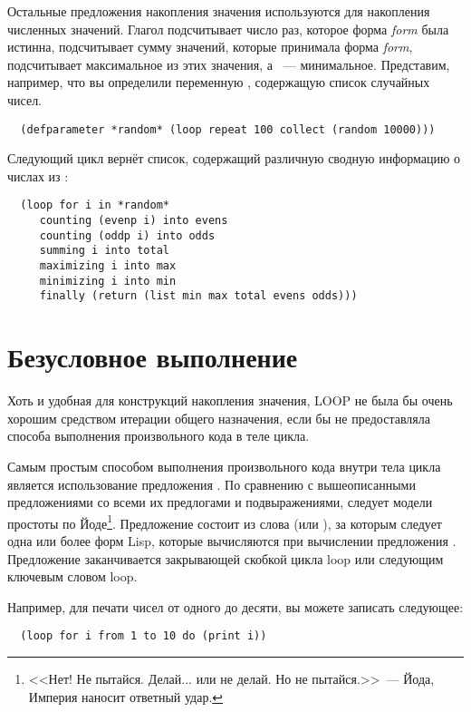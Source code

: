 Остальные предложения накопления значения используются для накопления численных
значений. Глагол  подсчитывает число раз, которое форма \textit{form} была
истинна,  подсчитывает сумму значений, которые принимала форма \textit{form},
 подсчитывает максимальное из этих значения, а ~---
минимальное. Представим, например, что вы определили переменную ,
содержащую список случайных чисел.

\begin{lstlisting}
  (defparameter *random* (loop repeat 100 collect (random 10000)))
\end{lstlisting}

Следующий цикл вернёт список, содержащий различную сводную информацию о числах из
:

\begin{lstlisting}
  (loop for i in *random*
     counting (evenp i) into evens
     counting (oddp i) into odds
     summing i into total
     maximizing i into max
     minimizing i into min
     finally (return (list min max total evens odds)))
\end{lstlisting}

\section{Безусловное выполнение}

Хоть и удобная для конструкций накопления значения, LOOP не была бы очень хорошим
средством итерации общего назначения, если бы не предоставляла способа выполнения
произвольного кода в теле цикла.

Самым простым способом выполнения произвольного кода внутри тела цикла является
использование предложения . По сравнению с вышеописанными предложениями со всеми
их предлогами и подвыражениями,  следует модели простоты по Йоде\footnote{<<Нет!
  Не пытайся. Делай... или не делай. Но не пытайся.>>~--- Йода, Империя наносит ответный
  удар.}. Предложение  состоит из слова  (или ), за которым
следует одна или более форм Lisp, которые вычисляются при вычислении предложения
. Предложение  заканчивается закрывающей скобкой цикла loop или
следующим ключевым словом loop.

Например, для печати чисел от одного до десяти, вы можете записать следующее:

\begin{lstlisting}
  (loop for i from 1 to 10 do (print i))
\end{lstlisting}

